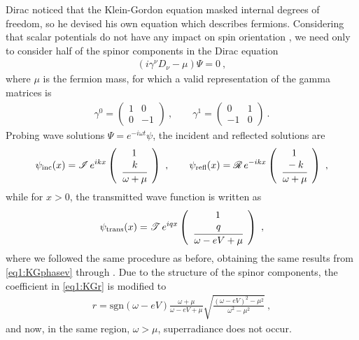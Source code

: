Dirac noticed that the Klein-Gordon equation masked internal degrees of freedom, so he devised his own equation which describes fermions.
Considering that scalar potentials do not have any impact on spin orientation \cite{Itzykson2012}, we need only to consider half of the spinor components in the Dirac equation
\begin{align}
    ( i \gamma^\nu D_\nu - \mu ) \Psi = 0 ~,
    \label{eq1:Dirac}
\end{align}
where $\mu$ is the fermion mass, for which a valid representation of the gamma matrices is
\begin{align}
    \gamma^0 = \left(\begin{array}{cr} 1 & 0 \\  0 & -1 \end{array}\right) ~,\qquad 
    \gamma^1 = \left(\begin{array}{cr} 0 & 1 \\ -1 &  0 \end{array}\right) ~.
    \label{eq1:Gamma1+1}
\end{align}
Probing wave solutions $\Psi= e^{-i\omega t} \psi$, the incident and reflected solutions are
\begin{align}
    \psi_\mathrm{inc}(x) = \mathscr{I}\, e^{i k x} \left(\begin{array}{c} 1 \\ \cfrac{k}{\omega+\mu} \end{array}\right) ~,\qquad
    \psi_\mathrm{refl}(x) = \mathscr{R}\, e^{- i k x} \left(\begin{array}{c} 1 \\ \cfrac{-k}{\omega+\mu} \end{array}\right) ~,
    \label{eq1:Diracsolneg}   
\end{align}
while for $x>0$, the transmitted wave function is written as 
\begin{align}
    \psi_\mathrm{trans}(x) = \mathscr{T}\, e^{i q x} \left(\begin{array}{c} 1 \\ \cfrac{q}{ \omega - e V + \mu} \end{array}\right) ~,
    \label{eq1:Diracsolpos} 
\end{align}
where we followed the same procedure as before, obtaining the same results from \eqref{eq1:KGphasev} through . 
Due to the structure of the spinor components, the coefficient in \eqref{eq1:KGr} is modified to
\begin{align}
    r = \mathrm{sgn}(\omega - e V) \frac{\omega+\mu}{\omega-e V+\mu} \sqrt{\frac{(\omega - e V)^2 - \mu^2}{\omega^2 - \mu^2}} ~,
    \label{eq1:Diracr} 
\end{align}
and now, in the same region, $\omega > \mu$, superradiance does not occur.

